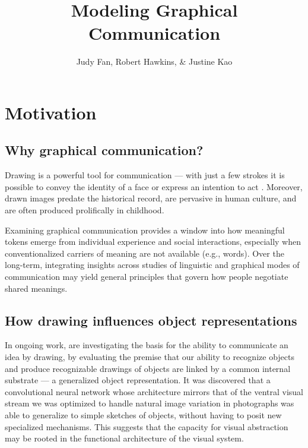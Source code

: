 \documentclass[12pt]{article}
\title{\textbf{Modeling Graphical Communication}}
\author{Judy Fan, Robert Hawkins, \& Justine Kao}
\begin{document}
\maketitle %

\section{Motivation}

\subsection{Why graphical communication?}

Drawing is a powerful tool for communication --- with just a few strokes it is possible to convey the identity of a face \cite{bergmann2013impact} or express an intention to act \cite{Galantucci:2005uh}. Moreover, drawn images predate the historical record, are pervasive in human culture, and are often produced prolifically in childhood.

Examining graphical communication provides a window into how meaningful tokens emerge from individual experience and social interactions, especially when conventionalized carriers of meaning are not available (e.g., words). Over the long-term, integrating insights across studies of linguistic and graphical modes of communication may yield general principles that govern how people negotiate shared meanings.  

\subsection{How drawing influences object representations}

In ongoing work,  are investigating the basis for the ability to communicate an idea by drawing, by evaluating the premise that our ability to recognize objects and produce recognizable drawings of objects are linked by a common internal substrate --- a generalized object representation. It was discovered that a convolutional neural network whose architecture mirrors that of the ventral visual stream we was optimized to handle natural image variation in photographs \cite{Yamins:2014gia} was able to generalize to simple sketches of objects, without having to posit new specialized mechanisms. This suggests that the capacity for visual abstraction may be rooted in the functional architecture of the visual system.
\end{document}
